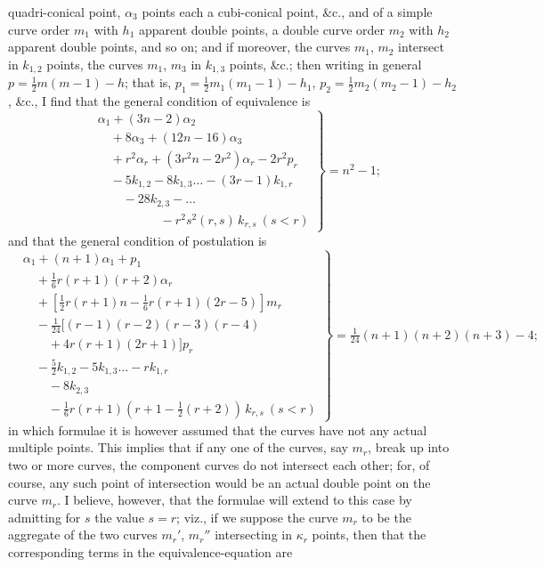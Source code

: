 \documentclass[11pt]{article}
\begin{document}
quadri-conical point, $\alpha_3$ points each a cubi-conical point, \&c., and of a simple curve
order $m_1$ with $h_1$ apparent double points, a double curve order $m_2$ with $h_2$ apparent
double points, and so on; and if moreover, the curves $m_1$, $m_2$ intersect in $k_{1,2}$ points,
the curves $m_1$, $m_3$ in $k_{1,3}$ points, \&c.; then writing in general $p = \tfrac{1}{2}m(m-1) - h$; that
is, $p_1 = \tfrac{1}{2}m_1(m_1 - 1) - h_1$, $p_2 = \tfrac{1}{2}m_2(m_2 - 1) - h_2$, \&c., I find that the general condition of
equivalence is
\[ \left.\begin{aligned}
& \alpha_1 + (3n - 2)\alpha_2\\
& \quad + 8\alpha_3 + (12n - 16)\alpha_3\\
& \quad + r^2\alpha_r + (3r^2n - 2r^2)\alpha_r - 2r^2 p_r\\
& \quad - 5k_{1,2} - 8k_{1,3} \ldots - (3r-1)k_{1,r}\\
& \quad\quad - 28 k_{2,3} - \ldots\\
& \quad\quad\quad\quad\quad - r^2 s^2 (r,s)\, k_{r,s}\ (s < r)
\end{aligned}\right\} = n^2 - 1; \]
and that the general condition of postulation is
\[ \left.\begin{aligned}
& \alpha_1 + (n+1)\alpha_1 + p_1\\
& \quad + \tfrac{1}{6} r(r+1)(r+2)\alpha_r\\
& \quad + [\tfrac{1}{2} r(r+1)n - \tfrac{1}{6} r(r+1)(2r-5)] m_r\\
& \quad - \tfrac{1}{24}\bigl[(r-1)(r-2)(r-3)(r-4)\\
& \quad\quad + 4r(r+1)(2r+1)\bigr] p_r\\
& \quad - \tfrac{5}{2}k_{1,2} - 5k_{1,3} \ldots - r k_{1,r}\\
& \quad\quad - 8k_{2,3}\\
& \quad\quad - \tfrac{1}{6} r(r+1)(r+1-\tfrac{1}{2}(r+2))\, k_{r,s}\ (s < r)
\end{aligned}\right\} = \tfrac{1}{24}(n+1)(n+2)(n+3) - 4; \]
in which formulae it is however assumed that the curves have not any actual multiple
points. This implies that if any one of the curves, say $m_r$, break up into two or
more curves, the component curves do not intersect each other; for, of course, any
such point of intersection would be an actual double point on the curve $m_r$. I believe,
however, that the formulae will extend to this case by admitting for $s$ the value $s = r$;
viz., if we suppose the curve $m_r$ to be the aggregate of the two curves $m_r'$, $m_r''$ inter\-secting in $\kappa_r$ points, then that the corresponding terms in the equivalence-equation are
\end{document}
